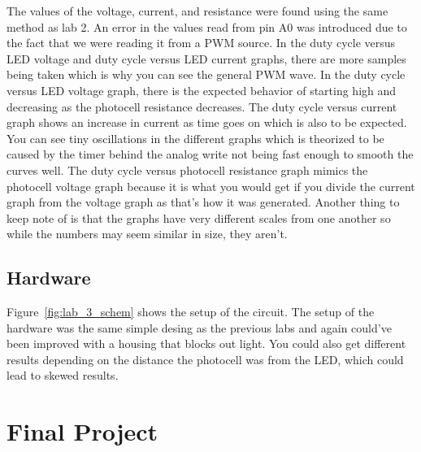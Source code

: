 \documentclass[12pt,titlepage]{article}
\begin{document}
The values of the voltage, current, and resistance were found using the same method as lab 2. An error in the values read from pin A0 was introduced due to
the fact that we were reading it from a PWM source. In the duty cycle versus LED voltage and duty cycle versus LED
current graphs, there are more samples being taken which is why you can see the general PWM wave. In the duty cycle versus LED voltage graph, there is the expected behavior of
starting high and decreasing as the photocell resistance decreases. The duty cycle versus current graph shows an increase in current as time goes on which is also to be expected.
You can see tiny oscillations in the different graphs which is theorized to be caused by the timer behind the analog write not being fast enough to smooth the curves well.
The duty cycle versus photocell resistance graph mimics the photocell voltage graph because it is what you would get if you divide the current graph from the voltage graph as that's
how it was generated. Another thing to keep note of is that the graphs have very different scales from one another so while the numbers may seem similar in size, they aren't.
\subsection{Hardware}
Figure~\ref{fig:lab_3_schem} shows the setup of the circuit. The setup of the hardware was the same simple desing as the previous labs and again could've been improved with a
housing that blocks out light. You could also get different results depending on the distance the photocell was from the LED, which could lead to skewed results.
\section{Final Project}
\end{document}
